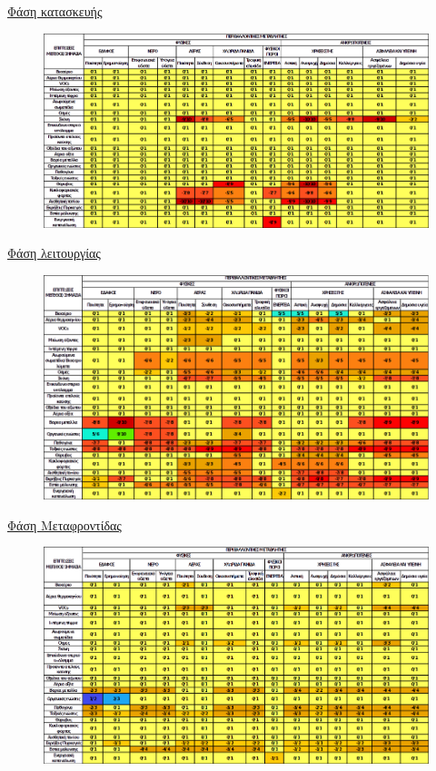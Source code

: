 \documentclass[12pt]{article}
\begin{document}
 	\underline{Φάση κατασκευής}
 	
 	\begin{figure} [H]
 		\begin{center}
 			\includegraphics [scale = 0.60] {table43.png}
 		\end{center}
 	\end{figure}
 
 	\underline{Φάση λειτουργίας}
 	
 	\begin{figure} [H]
 		\begin{center}
 			\includegraphics [scale = 0.60] {table44.png}
 		\end{center}
 	\end{figure}
 
 	\underline{Φάση Μεταφροντίδας}
 	
 	\begin{figure} [H]
 		\begin{center}
 			\includegraphics [scale = 0.60] {table45.png}
 		\end{center}
 	\end{figure}
 
\end{document}
